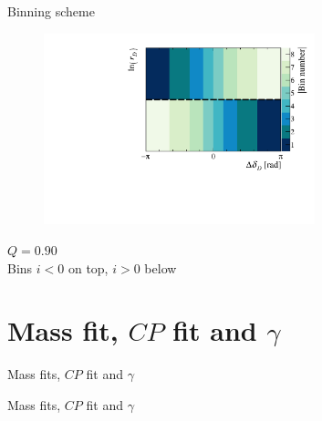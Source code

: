\documentclass{beamer}
\begin{document}
\begin{frame}{Binning scheme}
  \begin{figure}
    \centering
    \includegraphics[width = 0.7\textwidth]{Plots/BinningSchemePlot_8Bins.pdf}
  \end{figure}
  \vspace{-1.0cm}
  \begin{center}
    $Q = 0.90$ \\
    Bins $i < 0$ on top, $i > 0$ below
  \end{center}
\end{frame}

\section{Mass fit, \texorpdfstring{$C\!P$}{CP} fit and \texorpdfstring{$\gamma$}{gamma}}
\begin{frame}{Mass fits, $C\!P$ fit and $\gamma$}
  \begin{center}
    {\huge Mass fits, $C\!P$ fit and $\gamma$}
  \end{center}
\end{frame}
\end{document}
